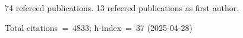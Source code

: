 74 refereed publications. 13 refeered publications as first author.

Total citations~=~4833; h-index~=~37 (2025-04-28)